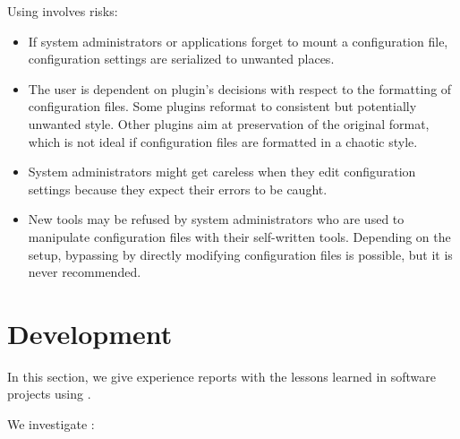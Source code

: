 Using \elektra{} involves risks:
\begin{itemize}
\item
If system administrators or applications forget to mount a configuration file, configuration settings are serialized to unwanted places.
\item
The user is dependent on plugin's decisions with respect to the formatting of configuration files.
Some plugins reformat to consistent but potentially unwanted style.
Other plugins aim at preservation of the original format, which is not ideal if configuration files are formatted in a chaotic style.
\item
System administrators might get careless when they edit configuration settings because they expect their errors to be caught.
\item
New tools may be refused by system administrators who are used to manipulate configuration files with their self-written tools.
Depending on the setup, bypassing \elektra{} by directly modifying configuration files is possible, but it is never recommended.
\end{itemize}








































\section{Development}
\label{sec:development}

In this section, we give experience reports with the lessons learned in software projects using \elektra{}.


We investigate :
\rqImplicationDevelopmentTime*

